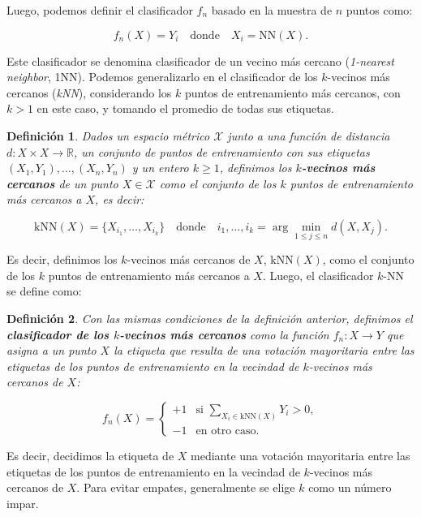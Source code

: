 \documentclass{report}
\newtheorem{dfn}{Definición}[subsection]
\begin{document}
Luego, podemos definir el clasificador \(f_n\) basado en la muestra de \(n\) puntos como:

\[
f_n(X) = Y_i \quad \text{donde} \quad X_i = \text{NN}(X).
\]

Este clasificador se denomina clasificador de un vecino más cercano (\textit{1-nearest neighbor}, 1NN). 
Podemos generalizarlo en el clasificador de los \(k\)-vecinos más cercanos (\textit{kNN}), considerando los \(k\) puntos de 
entrenamiento más cercanos, con $k>1$ en este caso, y tomando el promedio de todas sus etiquetas. \newline


\begin{dfn}
    Dados un espacio métrico \(\mathcal{X}\) junto a una función de distancia \(d : X \times X \to \mathbb{R}\), 
    un conjunto de puntos de entrenamiento con sus etiquetas \((X_1, Y_1), \dots, (X_n, Y_n)\) y un entero \(k \geq 1\), 
    definimos los \textbf{\(k\)-vecinos más cercanos} de un punto \(X \in \mathcal{X} \) como el conjunto de los \(k\) puntos 
    de entrenamiento más cercanos a \(X\), es decir:

    \[
    \text{kNN}(X) = \{X_{i_1}, \dots, X_{i_k}\} \quad \text{donde} \quad i_1, \dots, i_k = \arg\min_{1 \leq j \leq n} d(X, X_j).
    \]
\end{dfn}

Es decir, definimos los 
\(k\)-vecinos más cercanos de \(X\), \(\text{kNN}(X)\), como el conjunto de los \(k\) puntos de 
entrenamiento más cercanos a \(X\). Luego, el clasificador \(k\)-NN se define como:

\begin{dfn}
    Con las mismas condiciones de la definición anterior,
    definimos el \textbf{clasificador de los \(k\)-vecinos más cercanos} como la función \(f_n : X \to Y\) 
    que asigna a un punto \(X\) la etiqueta que resulta de una votación mayoritaria entre las etiquetas 
    de los puntos de entrenamiento en la vecindad de \(k\)-vecinos más cercanos de \(X\):


    \[
f_n(X) = 
\begin{cases} 
+1 & \text{si } \underset{{X_i \in \text{kNN}(X)}}{\sum}Y_i > 0, \\ 
-1 & \text{en otro caso}.
\end{cases}
\]
\end{dfn}


Es decir, decidimos la etiqueta de \(X\) mediante una votación mayoritaria entre las etiquetas de los 
puntos de entrenamiento en la vecindad de \(k\)-vecinos más cercanos de \(X\). Para evitar empates, 
generalmente se elige \(k\) como un número impar.\newline
\end{document}
